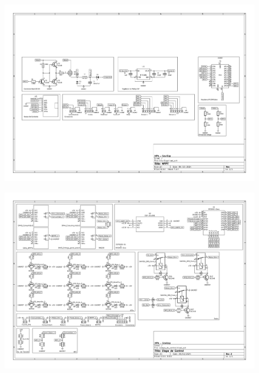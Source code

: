     \begin{landscape}
        \begin{figure}
            \centering
            \includegraphics[angle=270, width=\textwidth,height=\textheight,keepaspectratio]{Anexo_A/Esquemático - MPPT.pdf}
            \label{fig:A_1}
        \end{figure}
        
        \newpage

        \begin{figure}
            \centering
            \includegraphics[angle=270, width=\textwidth,height=\textheight,keepaspectratio]{Anexo_A/Esquemático - Etapa_de_Control.pdf}
            \label{fig:A_2}
        \end{figure}
        
    \end{landscape}
